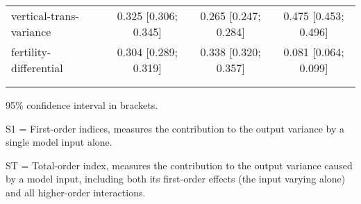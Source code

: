 \begin{table}[htp]
\begin{threeparttable}
\begin{tabular}{lccc}
	  \hspace{1.5em} vertical-trans-variance & 0.325 [0.306; 0.345]   & 0.265 [0.247; 0.284]   & 0.475 [0.453; 0.496] \\
	  \hspace{1.5em} fertility-differential & 0.304 [0.289; 0.319]   & 0.338 [0.320; 0.357]   & 0.081 [0.064; 0.099] \\
	 \\
\addlinespace
\hline
\end{tabular}
\begin{tablenotes}
\scriptsize
\item 95\% confidence interval in brackets.
\item S1 = First-order indices,  measures the contribution to the output variance by a single model input alone.
\item ST = Total-order index, measures the contribution to the output variance caused by a model input, including both its first-order effects (the input varying alone) and all higher-order interactions.
\end{tablenotes}
\end{threeparttable}
\end{table}